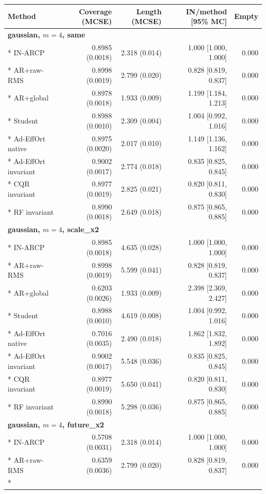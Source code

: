 \small
\begin{longtable}{lrrrr}
\toprule
Method & Coverage (MCSE) & Length (MCSE) & IN/method [95\% MC] & Empty \\
\midrule
\endhead
\midrule
\multicolumn{5}{l}{\textbf{gaussian, $m=4$, same}}\\*
IN-ARCP & 0.8985 (0.0018) & 2.318 (0.014) & 1.000 [1.000, 1.000] & 0.000 \\*
AR+raw-RMS & 0.8998 (0.0019) & 2.799 (0.020) & 0.828 [0.819, 0.837] & 0.000 \\*
AR+global & 0.8978 (0.0018) & 1.933 (0.009) & 1.199 [1.184, 1.213] & 0.000 \\*
Student & 0.8988 (0.0010) & 2.309 (0.004) & 1.004 [0.992, 1.016] & 0.000 \\*
Ad-EffOrt native & 0.8975 (0.0020) & 2.017 (0.010) & 1.149 [1.136, 1.162] & 0.000 \\*
Ad-EffOrt invariant & 0.9002 (0.0017) & 2.774 (0.018) & 0.835 [0.825, 0.845] & 0.000 \\*
CQR invariant & 0.8977 (0.0019) & 2.825 (0.021) & 0.820 [0.811, 0.830] & 0.000 \\*
RF invariant & 0.8990 (0.0018) & 2.649 (0.018) & 0.875 [0.865, 0.885] & 0.000 \\
\midrule
\multicolumn{5}{l}{\textbf{gaussian, $m=4$, scale\_x2}}\\*
IN-ARCP & 0.8985 (0.0018) & 4.635 (0.028) & 1.000 [1.000, 1.000] & 0.000 \\*
AR+raw-RMS & 0.8998 (0.0019) & 5.599 (0.041) & 0.828 [0.819, 0.837] & 0.000 \\*
AR+global & 0.6203 (0.0026) & 1.933 (0.009) & 2.398 [2.369, 2.427] & 0.000 \\*
Student & 0.8988 (0.0010) & 4.619 (0.008) & 1.004 [0.992, 1.016] & 0.000 \\*
Ad-EffOrt native & 0.7016 (0.0035) & 2.490 (0.018) & 1.862 [1.832, 1.892] & 0.000 \\*
Ad-EffOrt invariant & 0.9002 (0.0017) & 5.548 (0.036) & 0.835 [0.825, 0.845] & 0.000 \\*
CQR invariant & 0.8977 (0.0019) & 5.650 (0.041) & 0.820 [0.811, 0.830] & 0.000 \\*
RF invariant & 0.8990 (0.0018) & 5.298 (0.036) & 0.875 [0.865, 0.885] & 0.000 \\
\midrule
\multicolumn{5}{l}{\textbf{gaussian, $m=4$, future\_x2}}\\*
IN-ARCP & 0.5708 (0.0031) & 2.318 (0.014) & 1.000 [1.000, 1.000] & 0.000 \\*
AR+raw-RMS & 0.6359 (0.0036) & 2.799 (0.020) & 0.828 [0.819, 0.837] & 0.000 \\*

\end{longtable}
